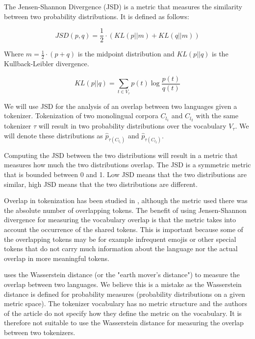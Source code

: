 The Jensen-Shannon Divergence (JSD) is a metric that measures the similarity between two probability distributions. It is defined as follows:

\begin{equation}
    JSD(p, q) = \frac{1}{2} \cdot (KL(p||m) + KL(q||m))
\end{equation}

Where $m = \frac{1}{2} \cdot (p + q)$ is the midpoint distribution and $KL(p||q)$ is the Kullback-Leibler divergence. 

\begin{equation}
    KL(p||q) = \sum_{t \in V_\tau} p(t) \log \frac{p(t)}{q(t)}
\end{equation}

We will use JSD for the analysis of an overlap between two languages given a tokenizer. Tokenization of two monolingual corpora $C_{l_1}$ and $C_{l_2}$ with the same tokenizer $\tau$ will result in two probability distributions over the vocabulary $V_\tau$. We will denote these distributions as $\hat{p}_{\tau(C_{l_1})}$ and $\hat{p}_{\tau(C_{l_2})}$. 

Computing the JSD between the two distributions will result in a metric that measures how much the two distributions overlap. The JSD is a symmetric metric that is bounded between 0 and 1. Low JSD means that the two distributions are similar, high JSD means that the two distributions are different. 

Overlap in tokenization has been studied in \citet{wu_beto_2019}, although the metric used there was the absolute number of overlapping tokens. The benefit of using Jensen-Shannon divergence for measuring the vocabulary overlap is that the metric takes into account the occurrence of the shared tokens. This is important because some of the overlapping tokens may be for example infrequent emojis or other special tokens that do not carry much information about the language nor the actual overlap in more meaningful tokens.

\citet{chung_improving_2020} uses the Wasserstein distance (or the "earth mover's distance") to measure the overlap between two languages. We believe this is a mistake as the Wasserstein distance is defined for probability measures (probability distributions on a given metric space). The tokenizer vocabulary has no metric structure and the authors of the article do not specify how they define the metric on the vocabulary. It is therefore not suitable to use the Wasserstein distance for measuring the overlap between two tokenizers.


